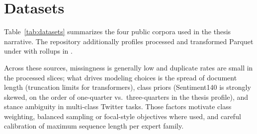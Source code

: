 \section{Datasets}
\label{sec:datasets}

Table~\ref{tab:datasets} summarizes the four public corpora used in the thesis narrative. The repository additionally profiles processed and transformed Parquet under  with rollups in .

Across these sources, missingness is generally low and duplicate rates are small in the processed slices; what drives modeling choices is the spread of document length (truncation limits for transformers), class priors (Sentiment140 is strongly skewed, on the order of one-quarter vs.\ three-quarters in the thesis profile), and stance ambiguity in multi-class Twitter tasks. Those factors motivate class weighting, balanced sampling or focal-style objectives where used, and careful calibration of maximum sequence length per expert family.

